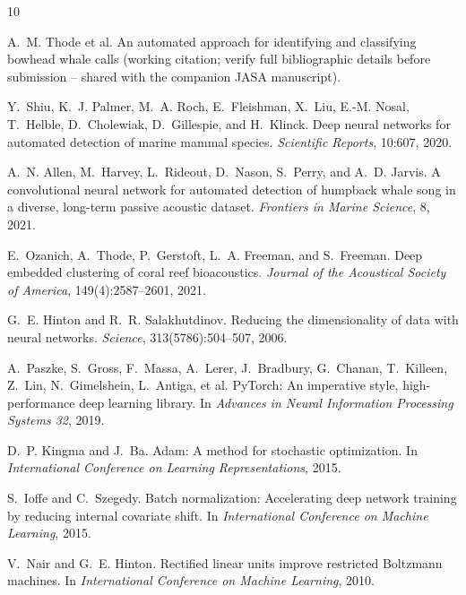 \documentclass{article}
\begin{document}
\begin{thebibliography}{10}

A.~M. Thode et al.
\newblock An automated approach for identifying and classifying bowhead whale calls (working citation; verify full bibliographic details before submission -- shared with the companion JASA manuscript).

Y.~Shiu, K.~J. Palmer, M.~A. Roch, E.~Fleishman, X.~Liu, E.-M. Nosal,
T.~Helble, D.~Cholewiak, D.~Gillespie, and H.~Klinck.
\newblock Deep neural networks for automated detection of marine mammal
species.
\newblock \emph{Scientific Reports}, 10:607, 2020.

A.~N. Allen, M.~Harvey, L.~Rideout, D.~Nason, S.~Perry, and A.~D. Jarvis.
\newblock A convolutional neural network for automated detection of
humpback whale song in a diverse, long-term passive acoustic dataset.
\newblock \emph{Frontiers in Marine Science}, 8, 2021.

E.~Ozanich, A.~Thode, P.~Gerstoft, L.~A. Freeman, and S.~Freeman.
\newblock Deep embedded clustering of coral reef bioacoustics.
\newblock \emph{Journal of the Acoustical Society of America},
149(4):2587--2601, 2021.

G.~E. Hinton and R.~R. Salakhutdinov.
\newblock Reducing the dimensionality of data with neural networks.
\newblock \emph{Science}, 313(5786):504--507, 2006.

A.~Paszke, S.~Gross, F.~Massa, A.~Lerer, J.~Bradbury, G.~Chanan,
T.~Killeen, Z.~Lin, N.~Gimelshein, L.~Antiga, et al.
\newblock PyTorch: An imperative style, high-performance deep learning
library.
\newblock In \emph{Advances in Neural Information Processing Systems 32},
2019.

D.~P. Kingma and J.~Ba.
\newblock Adam: A method for stochastic optimization.
\newblock In \emph{International Conference on Learning Representations},
2015.

S.~Ioffe and C.~Szegedy.
\newblock Batch normalization: Accelerating deep network training by
reducing internal covariate shift.
\newblock In \emph{International Conference on Machine Learning}, 2015.

V.~Nair and G.~E. Hinton.
\newblock Rectified linear units improve restricted Boltzmann machines.
\newblock In \emph{International Conference on Machine Learning}, 2010.


\end{thebibliography}
\end{document}

